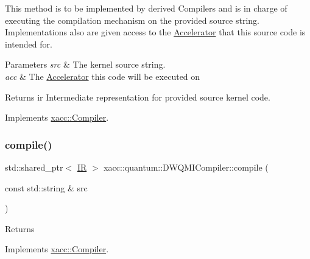 This method is to be implemented by derived Compilers and is in charge of executing the compilation mechanism on the provided source string. Implementations also are given access to the \hyperlink{a01111}{Accelerator} that this source code is intended for.


\begin{DoxyParams}{Parameters}
{\em src} & The kernel source string. \\
\hline
{\em acc} & The \hyperlink{a01111}{Accelerator} this code will be executed on \\
\hline
\end{DoxyParams}
\begin{DoxyReturn}{Returns}
ir Intermediate representation for provided source kernel code. 
\end{DoxyReturn}


Implements \hyperlink{a01127_a546a40c95bb93af6a0c0ac48dbeaffc8}{xacc\+::\+Compiler}.

\mbox{\label{a00923_aa22591343b5509bf2c3a5820130ba906}} 
\subsubsection{\texorpdfstring{compile()}{compile()}\hspace{0.1cm}{\footnotesize\ttfamily [2/2]}}
{\footnotesize\ttfamily std\+::shared\+\_\+ptr$<$ \hyperlink{a01175}{IR} $>$ xacc\+::quantum\+::\+D\+W\+Q\+M\+I\+Compiler\+::compile (\begin{DoxyParamCaption}\item[{const std\+::string \&}]{src }\end{DoxyParamCaption})\hspace{0.3cm}{\ttfamily [virtual]}}

\begin{DoxyReturn}{Returns}

\end{DoxyReturn}


Implements \hyperlink{a01127_a9092f5f779b570c91569b59621280c04}{xacc\+::\+Compiler}.

\mbox{\label{a00923_aed42de96f8e0dd94b6de183f28aee419}} 
